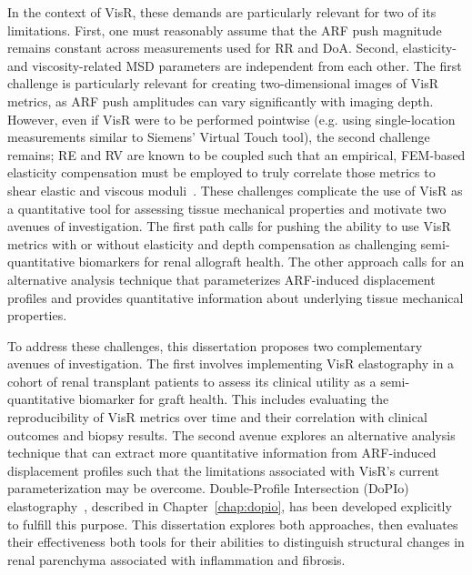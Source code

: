 In the context of VisR, these demands are particularly relevant for two of its limitations. First, one must reasonably assume that the ARF push magnitude remains constant across measurements used for RR and DoA. Second, elasticity- and viscosity-related MSD parameters are independent from each other. The first challenge is particularly relevant for creating two-dimensional images of VisR metrics, as ARF push amplitudes can vary significantly with imaging depth. However, even if VisR were to be performed pointwise (e.g. using single-location measurements similar to Siemens' Virtual Touch tool), the second challenge remains; RE and RV are known to be coupled such that an empirical, FEM-based elasticity compensation must be employed to truly correlate those metrics to shear elastic and viscous moduli~\cite{hossain_Viscoelastic_2020}. These challenges complicate the use of VisR as a quantitative tool for assessing tissue mechanical properties and motivate two avenues of investigation. The first path calls for pushing the ability to use VisR metrics with or without elasticity and depth compensation as challenging semi-quantitative biomarkers for renal allograft health. The other approach calls for an alternative analysis technique that parameterizes ARF-induced displacement profiles and provides quantitative information about underlying tissue mechanical properties. 


To address these challenges, this dissertation proposes two complementary avenues of investigation. The first involves implementing VisR elastography in a cohort of renal transplant patients to assess its clinical utility as a semi-quantitative biomarker for graft health. This includes evaluating the reproducibility of VisR metrics over time and their correlation with clinical outcomes and biopsy results. The second avenue explores an alternative analysis technique that can extract more quantitative information from ARF-induced displacement profiles such that the limitations associated with VisR's current parameterization may be overcome. Double-Profile Intersection (DoPIo) elastography~\cite{yokoyama_Doubleprofile_2019,yokoyama_DoubleProfile_2025}, described in Chapter~\ref{chap:dopio}, has been developed explicitly to fulfill this purpose. This dissertation explores both approaches, then evaluates their effectiveness both tools for their abilities to distinguish structural changes in renal parenchyma associated with inflammation and fibrosis.
